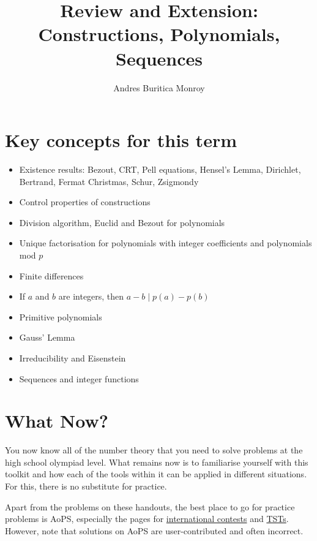 \documentclass{article}
\title{Review and Extension: Constructions, Polynomials, Sequences}
\author{Andres Buritica Monroy}
\date{}
\begin{document}
\maketitle
\section{Key concepts for this term}
\begin{itemize}
  \item Existence results: Bezout, CRT, Pell equations, Hensel's
    Lemma, Dirichlet, Bertrand, Fermat Christmas, Schur, Zsigmondy
  \item Control properties of constructions
  \item Division algorithm, Euclid and Bezout for polynomials
  \item Unique factorisation for polynomials with integer coefficients and
    polynomials mod $p$
  \item Finite differences
  \item If $a$ and $b$ are integers, then $a-b\mid p(a)-p(b)$
  \item Primitive polynomials
  \item Gauss' Lemma
  \item Irreducibility and Eisenstein
  \item Sequences and integer functions
\end{itemize}
\section{What Now?}
You now know all of the number theory that you need to solve problems
at the high school olympiad level. What remains now
is to familiarise yourself with this toolkit and how each of the tools within it
can be applied in different situations. For this, there is no substitute for
practice.

Apart from the problems on these handouts, the best place to go for
practice problems is AoPS, especially
the pages for \href{https://artofproblemsolving.com/community/c14}{international
contests} and \href{https://artofproblemsolving.com/community/c59}{TSTs}.
However, note that solutions on AoPS are user-contributed and often incorrect.
\end{document}
